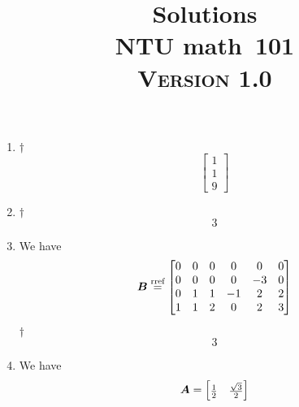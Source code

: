 \documentclass[a4paper,12pt]{article}
\newcommand{\school}{ntu}
\newcommand{\subject}{math}
\renewcommand{\year}{101}
\newcommand{\titlename}{\MakeUppercase{\school} \subject \ \year}
\newcommand{\ver}{\textsc{Version} 1.0} %
\begin{document}
\title{\LARGE{\textbf{Solutions}} \\
	\Huge{\textbf{\titlename}} \\
	\normalsize{\ver}
}
\author{}
\date{}

\maketitle


\begin{enumerate}
	\item \begin{answer}{$\dag$}\begin{equation}
            \begin{bmatrix}
                1 \\
                1 \\
                9
            \end{bmatrix}    
        \end{equation}
    \end{answer}
    \item \begin{answer}{$\dag$}\begin{equation}
            3    
        \end{equation}
    \end{answer}
    \item We have \begin{equation}
        \boldsymbol{B} \overset{\text{rref}}= \begin{bmatrix}
            0 & 0 & 0 & 0 & 0 & 0 \\
            0 & 0 & 0 & 0 & -3 & 0 \\
            0 & 1 & 1 & -1 & 2 & 2 \\
            1 & 1 & 2 & 0 & 2 & 3 \\
        \end{bmatrix}
    \end{equation}
    \begin{answer}{$\dag$}\begin{equation}
            3    
        \end{equation}
    \end{answer}
    \item We have \begin{equation}
        \boldsymbol{A} = \begin{bmatrix}
            \frac{1}{2} & \frac{\sqrt{3}}{2} \\

\end{bmatrix}
\end{equation}
\end{enumerate}
\end{document}
